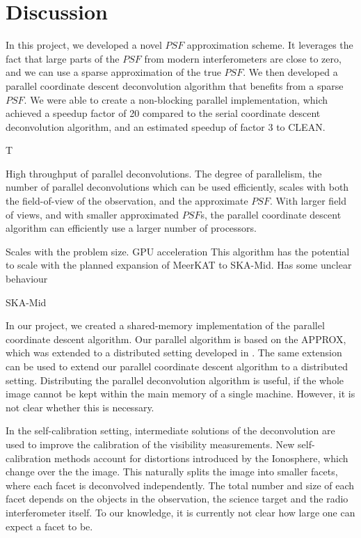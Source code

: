 \section{Discussion}\label{discussion}
In this project, we developed a novel $PSF$ approximation scheme. It leverages the fact that large parts of the $PSF$ from modern interferometers are close to zero, and we can use a sparse approximation of the true $PSF$. We then developed a parallel coordinate descent deconvolution algorithm that benefits from a sparse $PSF$.  We were able to create a non-blocking parallel implementation, which achieved a speedup factor of 20 compared to the serial coordinate descent deconvolution algorithm, and an estimated speedup of factor 3 to CLEAN.

T

High throughput of parallel deconvolutions.
The degree of parallelism, the number of parallel deconvolutions which can be used efficiently, scales with both the field-of-view of the observation, and the approximate $PSF$. With larger field of views, and with smaller approximated $PSF$s, the parallel coordinate descent algorithm can efficiently use a larger number of processors. 

Scales with the problem size.
GPU acceleration
This algorithm has the potential to scale with the planned expansion of MeerKAT to SKA-Mid.
Has some unclear behaviour

SKA-Mid

In our project, we created a shared-memory implementation of the parallel coordinate descent algorithm. Our parallel algorithm is based on the APPROX\cite{fercoq2015accelerated}, which was extended to a distributed setting developed in \cite{fercoqfast}. The same extension can be used to extend our parallel coordinate descent algorithm to a distributed setting. Distributing the parallel deconvolution algorithm is useful, if the whole image cannot be kept within the main memory of a single machine. However, it is not clear whether this is necessary.

In the self-calibration setting, intermediate solutions of the deconvolution are used to improve the calibration of the visibility measurements. New self-calibration methods account for distortions introduced by the Ionosphere, which change over the the image. This naturally splits the image into smaller facets, where each facet is deconvolved independently\cite{van2016lofar}. The total number and size of each facet depends on the objects in the observation, the science target and the radio interferometer itself. To our knowledge, it is currently not clear how large one can expect a facet to be.

